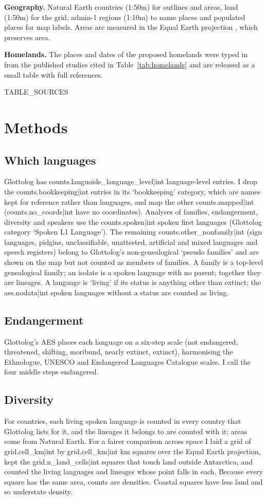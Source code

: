 \documentclass[11pt,a4paper]{article}
\begin{document}
\textbf{Geography.} Natural Earth \citep{naturalearth} countries (1:50m) for outlines and areas, land (1:50m) for the grid, admin-1 regions (1:10m) to name places and populated places for map labels. Areas are measured in the Equal Earth projection \citep{equalearth}, which preserves area.

\textbf{Homelands.} The places and dates of the proposed homelands were typed in from the published studies cited in Table~\ref{tab:homelands} and are released as a small table with full references.

{{TABLE_SOURCES}}

\section{Methods}
\subsection{Which languages}
Glottolog has {{counts.languoids_language_level|int}} language-level entries. I drop the {{counts.bookkeeping|int}} entries in its `bookkeeping' category, which are names kept for reference rather than languages, and map the other {{counts.mapped|int}} ({{counts.no_coords|int}} have no coordinates). Analyses of families, endangerment, diversity and speakers use the {{counts.spoken|int}} spoken first languages (Glottolog category `Spoken L1 Language'). The remaining {{counts.other_nonfamily|int}} (sign languages, pidgins, unclassifiable, unattested, artificial and mixed languages and speech registers) belong to Glottolog's non-genealogical `pseudo families' and are shown on the map but not counted as members of families. A family is a top-level genealogical family; an isolate is a spoken language with no parent; together they are lineages. A language is `living' if its status is anything other than extinct; the {{aes.nodata|int}} spoken languages without a status are counted as living.

\subsection{Endangerment}
Glottolog's AES places each language on a six-step scale (not endangered, threatened, shifting, moribund, nearly extinct, extinct), harmonising the Ethnologue, UNESCO and Endangered Languages Catalogue scales. I call the four middle steps endangered.

\subsection{Diversity}
For countries, each living spoken language is counted in every country that Glottolog lists for it, and the lineages it belongs to are counted with it; areas come from Natural Earth. For a fairer comparison across space I laid a grid of {{grid.cell_km|int}} by {{grid.cell_km|int}} km squares over the Equal Earth projection, kept the {{grid.n_land_cells|int}} squares that touch land outside Antarctica, and counted the living languages and lineages whose point falls in each. Because every square has the same area, counts are densities. Coastal squares have less land and so understate density.
\end{document}
